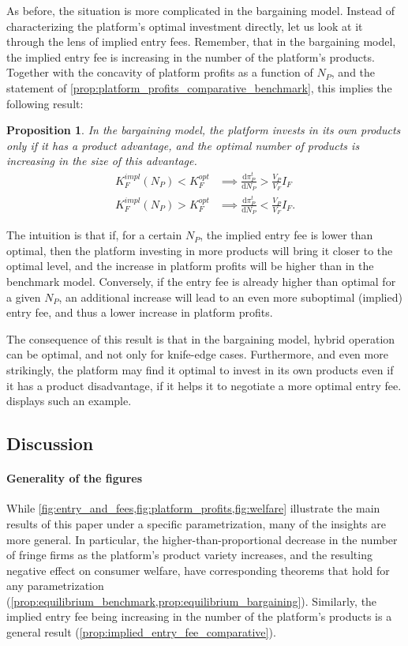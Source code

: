 \documentclass[a4paper]{article}
\newtheorem{proposition}{Proposition}
\newcommand{\dd}{\mathrm{d}}
\begin{document}
As before, the situation is more complicated in the bargaining model.
Instead of characterizing the platform's optimal investment directly, let us look at it through the lens of implied entry fees.
Remember, that in the bargaining model, the implied entry fee is increasing in the number of the platform's products.
Together with the concavity of platform profits as a function of $N_P$, and the statement of \cref{prop:platform_profits_comparative_benchmark}, this implies the following result:
\begin{proposition}
    \label{prop:comparative_n_p_bargaining}
    In the bargaining model, the platform invests in its own products only if it has a product advantage, and the optimal number of products is increasing in the size of this advantage.
    \begin{align*}
        K_F^{impl}(N_P) < K_F^{opt} &\implies \frac{\dd \pi_P^t}{\dd N_P} > \frac{V_P}{V_F} I_F \\
        K_F^{impl}(N_P) > K_F^{opt} &\implies \frac{\dd \pi_P^t}{\dd N_P} < \frac{V_P}{V_F} I_F.
    \end{align*}
\end{proposition}
The intuition is that if, for a certain $N_P$, the implied entry fee is lower than optimal, then the platform investing in more products will bring it closer to the optimal level, and the increase in platform profits will be higher than in the benchmark model.
Conversely, if the entry fee is already higher than optimal for a given $N_P$, an additional increase will lead to an even more suboptimal (implied) entry fee, and thus a lower increase in platform profits.

The consequence of this result is that in the bargaining model, hybrid operation can be optimal, and not only for knife-edge cases.
Furthermore, and even more strikingly, the platform may find it optimal to invest in its own products even if it has a product disadvantage, if it helps it to negotiate a more optimal entry fee.
 displays such an example.

\subsection{Discussion}
\label{sec:results_discussion}

\paragraph{Generality of the figures}
While \cref{fig:entry_and_fees,fig:platform_profits,fig:welfare} illustrate the main results of this paper under a specific parametrization, many of the insights are more general.
In particular, the higher-than-proportional decrease in the number of fringe firms as the platform's product variety increases, and the resulting negative effect on consumer welfare, have corresponding theorems that hold for any parametrization (\cref{prop:equilibrium_benchmark,prop:equilibrium_bargaining}).
Similarly, the implied entry fee being increasing in the number of the platform's products is a general result (\cref{prop:implied_entry_fee_comparative}).
\end{document}

